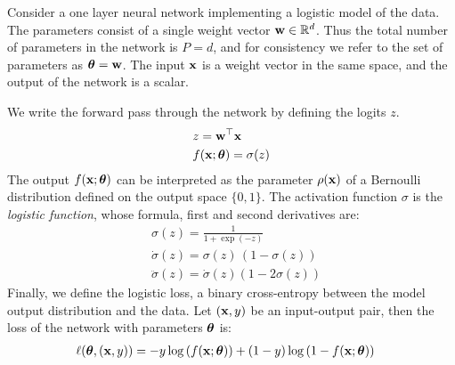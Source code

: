 \documentclass{article} %
\begin{document}
\begin{center}
\end{center}

Consider a one layer neural network implementing a logistic model of the data. The parameters consist of a single weight vector $\mbox{$\mbox{$\mathbf{w}$}$} \in \mathbb{R}^d$. Thus the total number of parameters in the network is $P=d$, and for consistency we refer to the set of parameters as $\mbox{$\mbox{$\boldsymbol{\theta}$}$} = \mbox{$\mbox{$\mathbf{w}$}$}$. The input $\mbox{$\mbox{$\mathbf{x}$}$}$ is a weight vector in the same space, and the output of the network is a scalar. 

We write the forward pass through the network by defining the logits $z$. 
\begin{align}
    & z = \mbox{$\mbox{$\mathbf{w}$}$}^\top\mbox{$\mbox{$\mathbf{x}$}$}\\
    & f(\mbox{$\mbox{$\mathbf{x}$}$}; \mbox{$\mbox{$\boldsymbol{\theta}$}$}) = \sigma(z)
\end{align}
The output $f(\mbox{$\mbox{$\mathbf{x}$}$}; \mbox{$\mbox{$\boldsymbol{\theta}$}$})$ can be interpreted as the parameter $\rho(\mbox{$\mbox{$\mathbf{x}$}$})$ of a Bernoulli distribution defined on the output space $\{0,1\}$. 
The activation function $\sigma$ is the \emph{logistic function}, whose formula, first and second derivatives are: 
\begin{align}
    & \sigma(z) = \frac{1}{1 + \exp(-z)}\\
    & \dot\sigma(z) = \sigma(z)\,(1 - \sigma(z))\\
    & \ddot\sigma(z) = \dot\sigma(z) (1 - 2\sigma(z))
\end{align}
Finally, we define the logistic loss, a binary cross-entropy between the model output distribution and the data. Let $(\mbox{$\mbox{$\mathbf{x}$}$},y)$ be an input-output pair, then the loss of the network with parameters $\mbox{$\mbox{$\boldsymbol{\theta}$}$}$ is:
\begin{align}
    & \ell(\mbox{$\mbox{$\boldsymbol{\theta}$}$}, (\mbox{$\mbox{$\mathbf{x}$}$},y)) = -y \log \left(f(\mbox{$\mbox{$\mathbf{x}$}$}; \mbox{$\mbox{$\boldsymbol{\theta}$}$})\right) + (1-y) \log\left(1 - f(\mbox{$\mbox{$\mathbf{x}$}$}; \mbox{$\mbox{$\boldsymbol{\theta}$}$})\right)
\end{align}
\end{document}

